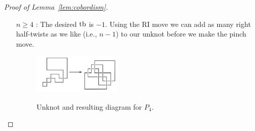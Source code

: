\begin{proof}[Proof of Lemma~\ref{lem:cobordism}]
\begin{itemize}
    \item[$n \geq 4$ :]
        The desired $\operatorname{tb}$ is $-1$. Using the RI move we can add as many right half-twists as we like (i.e., $n - 1$) to our unknot before we make the pinch move.
        \begin{figure}[h!]
            \centering
            \includegraphics[width=0.4\textwidth]{images/pretzel-+4-construction.pdf}
            \label{fig:pretzel+4}
            \caption{Unknot and resulting diagram for $P_{4}$.}
        \end{figure}

\end{itemize}

\end{proof}
